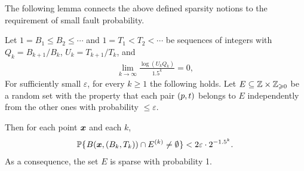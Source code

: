 \documentclass[12pt]{memoir}
\renewcommand{\le}{\leq}
\def\B{B}
\def\U{U}
\newcommand{\Tu}{T}
\begin{document}
The following lemma connects the above defined sparsity notions to the requirement
of small fault probability.

\begin{lemma}[Sparsity]\label{lem:sparsiness}
Let \( 1=\B_{1}\le  \B_{2}\le\dotsm \) and 
\( 1=\Tu_{1}<T_{2}<\dotsm \) be sequences of integers with
\( Q_k = B_{k+1}/B_{k} \), \( \U_k = \Tu_{k+1}/\Tu_{k} \), and
\begin{align}\label{eq:assumption}
  \lim_{k\rightarrow\infty}\frac{\log(\U_{k} Q_k)}{1.5^k}=0,
\end{align}
For sufficiently small \( \varepsilon \), for every \( k\ge 1 \) the following holds.
Let \( E\subseteq \mathbb{Z}\times \mathbb{Z}_{\geqslant 0} \)
be a random set with the property that each pair \( (p,t) \) belongs to \( E \)
independently from the other ones with probability \( \le \varepsilon \).

Then for each point \( \boldsymbol{x} \)  and each \( k \),
 \begin{align*}
   \Pbof{B(\vek{x},(\B_k, \Tu_{k}))\cap E^{(k)}\neq\emptyset} <2\varepsilon \cdot 2^{-1.5^{k}}.
 \end{align*}
As a consequence, the set \( E \) is sparse with probability 1.
\end{lemma}
\end{document}
